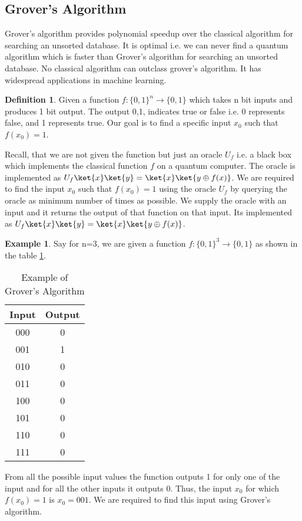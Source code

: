 \documentclass[12pt, oneside]{book}
\theoremstyle{definition}
\newtheorem{definition}{Definition}[section]
\theoremstyle{definition}
\newtheorem{example}{Example}[section]
\theoremstyle{remark}
\begin{document}
\subsection{Grover's Algorithm}
Grover's algorithm provides polynomial speedup over the classical algorithm for searching an unsorted database.
It is optimal i.e. we can never find a quantum algorithm which is faster than Grover's algorithm for searching an unsorted database.
No classical algorithm can outclass grover's algorithm. It has widespread applications in machine learning.

\begin{definition}
    Given a function $f:\{0,1\}^n \rightarrow \{0,1\}$ which takes n bit inputs and produces 1 bit output. The output 0,1, indicates 
    true or false i.e. 0 represents false, and 1 represents true. Our goal is to find a specific input
    $x_0$ such that $f(x_0)=1$.
\end{definition}

Recall, that we are not given the function but just an oracle $U_f$ i.e. a black box which implements the classical function $f$ on a quantum
computer. The oracle is implemented as $U_f\ket{x}\ket{y}=\ket{x}\ket{y\oplus f(x)}$. We are required to find the input $x_0$ such that $f(x_0)=1$ 
using the oracle $U_f$ by querying the oracle as minimum number of times as possible. We supply the oracle with an input and it returns the output of that function 
on that input. Its implemented as $U_f\ket{x}\ket{y}=\ket{x}\ket{y\oplus f(x)}$.

\begin{example}
    Say for n=3, we are given a function $f:\{0,1\}^3 \rightarrow \{0,1\}$ as shown in the table \ref{tab:groverex}.
    \begin{table}[H]
        \centering
        \begin{tabular}{|c|c|}
            \hline
            Input & Output \\
            \hline
            000 & 0 \\
            001 & 1 \\
            010 & 0 \\
            011 & 0 \\
            100 & 0 \\
            101 & 0 \\
            110 & 0 \\
            111 & 0 \\
            \hline
        \end{tabular}
        \caption{Example of Grover's Algorithm}
        \label{tab:groverex}
    \end{table}
    From all the possible input values the function outputs 1 for only one of the input and for all the other inputs it outputs 0.
    Thus, the input $x_0$ for which $f(x_0)=1$ is $x_0=001$. We are required to find this input using Grover's algorithm.
\end{example}
\end{document}
